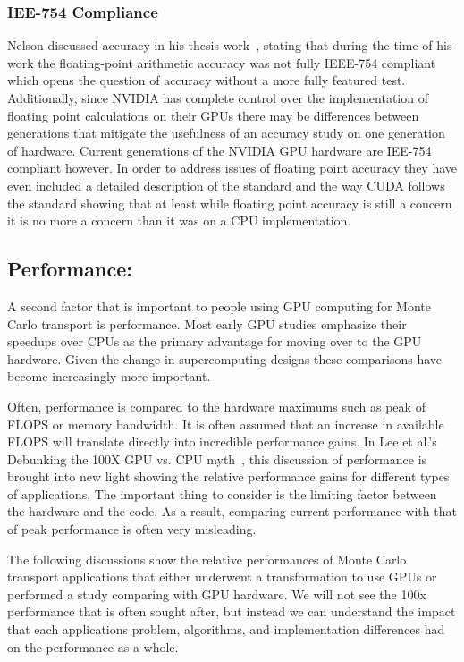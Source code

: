 \subsubsection*{\textbf{IEE-754 Compliance}}
Nelson discussed accuracy in his thesis work~\cite{nelson2009monte}, stating that during the time of his work the floating-point arithmetic accuracy was not fully IEEE-754 compliant which opens the question of accuracy without a more fully featured test. 
%
Additionally, since NVIDIA has complete control over the implementation of floating point calculations on their GPUs there may be differences between generations that mitigate the usefulness of an accuracy study on one generation of hardware.
%
Current generations of the NVIDIA GPU hardware are IEE-754 compliant however. 
%
In order to address issues of floating point accuracy they have even included a detailed description of the standard and the way CUDA follows the standard showing that at least while floating point accuracy is still a concern it is no more a concern than it was on a CPU implementation.~\cite{cudaToolkitv7.5}
%

\subsection*{\textbf{Performance:}}

A second factor that is important to people using GPU computing for Monte Carlo transport is performance.
%
Most early GPU studies emphasize their speedups over CPUs as the primary advantage for moving over to the GPU hardware.
%
Given the change in supercomputing designs these comparisons have become increasingly more important.
%

%
Often, performance is compared to the hardware maximums such as peak of FLOPS or memory bandwidth.
%
It is often assumed that an increase in available FLOPS will translate directly into incredible performance gains.
%
In Lee et al.'s Debunking the 100X GPU vs. CPU myth~\cite{lee2010debunking}, this discussion of performance is brought into new light showing the relative performance gains for different types of applications.
%
The important thing to consider is the limiting factor between the hardware and the code.
%
As a result, comparing current performance with that of peak performance is often very misleading.
%

%
The following discussions show the relative performances of Monte Carlo transport applications that either underwent a transformation to use GPUs or performed a study comparing with GPU hardware.
%
We will not see the 100x performance that is often sought after, but instead we can understand the impact that each applications problem, algorithms, and implementation differences had on the performance as a whole.
%

